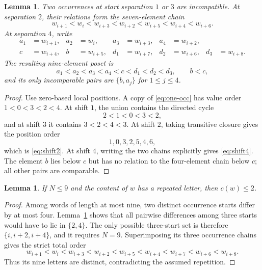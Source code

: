 \documentclass[11pt]{article}
\newtheorem{lemma}[theorem]{Lemma}
\begin{document}
\begin{lemma}\label{lem:overlaps}
Two occurrences at start separation $1$ or $3$ are incompatible.  At
separation $2$, their relations form the seven-element chain
\begin{equation}\label{eq:shift2}
 w_{i+1}<w_i<w_{i+3}<w_{i+2}<w_{i+5}<w_{i+4}<w_{i+6}.
\end{equation}
At separation $4$, write
\[
\begin{aligned}
 a_1&=w_{i+1},&a_2&=w_i,&a_3&=w_{i+3},&a_4&=w_{i+2},\\
 c&=w_{i+4},&b&=w_{i+5},&d_1&=w_{i+7},&d_2&=w_{i+6},
 &d_3&=w_{i+8}.
\end{aligned}
\]
The resulting nine-element poset is
\begin{equation}\label{eq:shift4}
 a_1<a_2<a_3<a_4<c<d_1<d_2<d_3,
 \qquad b<c,
\end{equation}
and its only incomparable pairs are $\{b,a_j\}$ for $1\leq j\leq4$.
\end{lemma}

\begin{proof}
Use zero-based local positions.  A copy of \eqref{eq:one-occ} has value order
$1<0<3<2<4$.  At shift $1$, the union contains the directed cycle
\[
 2<1<0<3<2,
\]
and at shift $3$ it contains $3<2<4<3$.  At shift $2$, taking transitive
closure gives the position order
\[
 1,0,3,2,5,4,6,
\]
which is \eqref{eq:shift2}.  At shift $4$, writing the two chains explicitly
gives \eqref{eq:shift4}.  The element $b$ lies below $c$ but has no relation
to the four-element chain below $c$; all other pairs are comparable.
\end{proof}

\begin{lemma}\label{lem:degree}
If $N\leq9$ and the content of $w$ has a repeated letter, then $c(w)\leq2$.
\end{lemma}

\begin{proof}
Among words of length at most nine, two distinct occurrence starts differ by
at most four.  Lemma~\ref{lem:overlaps} shows that all pairwise differences
among three starts would have to lie in $\{2,4\}$.  The only possible
three-start set is therefore $\{i,i+2,i+4\}$, and it requires $N=9$.
Superimposing its three occurrence chains gives the strict total order
\[
 w_{i+1}<w_i<w_{i+3}<w_{i+2}<w_{i+5}<w_{i+4}
 <w_{i+7}<w_{i+6}<w_{i+8}.
\]
Thus its nine letters are distinct, contradicting the assumed repetition.
\end{proof}
\end{document}
